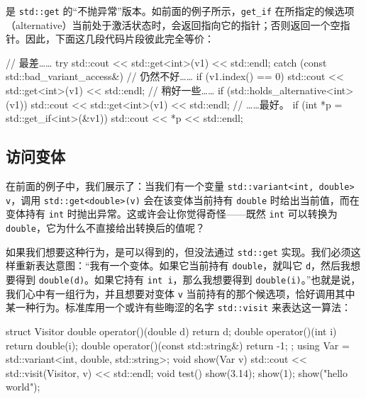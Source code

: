 是 \texttt{std::\allowbreak{}get} 的“不抛异常”版本。如前面的例子所示，\texttt{get\_\allowbreak{}if} 在所指定的候选项（alternative）当前处于激活状态时，会返回指向它的指针；否则返回一个空指针。因此，下面这几段代码片段彼此完全等价：

\begin{codebox}[cpp]
    // 最差……
    try {
      std::cout << std::get<int>(v1) << std::endl;
    } catch (const std::bad_variant_access&) {}
    // 仍然不好……
    if (v1.index() == 0) {
      std::cout << std::get<int>(v1) << std::endl;
    }
    // 稍好一些……
    if (std::holds_alternative<int>(v1)) {
      std::cout << std::get<int>(v1) << std::endl;
    }
    // ……最好。
    if (int *p = std::get_if<int>(&v1)) {
      std::cout << *p << std::endl;
    }
\end{codebox}

\subsection{访问变体}

在前面的例子中，我们展示了：当我们有一个变量 \texttt{std::\allowbreak{}variant<\allowbreak{}int,\allowbreak{} double>\allowbreak{} v}，调用 \texttt{std::\allowbreak{}get<\allowbreak{}double>\allowbreak{}(\allowbreak{}v)\allowbreak{}} 会在该变体当前持有 \texttt{double} 时给出当前值，而在变体持有 \texttt{int} 时抛出异常。这或许会让你觉得奇怪——既然 \texttt{int} 可以转换为 \texttt{double}，它为什么不直接给出转换后的值呢？

如果我们想要这种行为，是可以得到的，但没法通过 \texttt{std::\allowbreak{}get} 实现。我们必须这样重新表达意图：“我有一个变体。如果它当前持有 \texttt{double}，就叫它 \texttt{d}，然后我想要得到 \texttt{double(\allowbreak{}d)\allowbreak{}}。如果它持有 \texttt{int i}，那么我想要得到 \texttt{double(\allowbreak{}i)\allowbreak{}}。”也就是说，我们心中有一组行为，并且想要对变体 \texttt{v} 当前持有的那个候选项，恰好调用其中某一种行为。标准库用一个或许有些晦涩的名字 \texttt{std::\allowbreak{}visit} 来表达这一算法：

\begin{codebox}[cpp]
    struct Visitor {
      double operator()(double d) { return d; }
      double operator()(int i) { return double(i); }
      double operator()(const std::string&) { return -1; }
    };
    using Var = std::variant<int, double, std::string>;
    void show(Var v)
    {
      std::cout << std::visit(Visitor{}, v) << std::endl;
    }
    void test()
    {
      show(3.14);
      show(1);
      show("hello world");
    }
\end{codebox}


